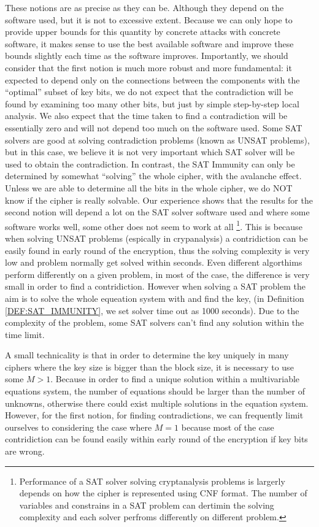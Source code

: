 These notions are as precise as they can be. Although they depend on the software used, but it is not to excessive extent. Because we can only hope to provide upper bounds for this quantity by concrete attacks with concrete software, it makes sense to use the best available software and improve these bounds slightly each time as the software improves.
Importantly, we should consider that the first notion is much more robust and more fundamental: it expected to depend only on the connections between the components with the ``optimal'' subset of key bits, we do not expect that the contradiction will be found by examining too many other bits, but just by simple step-by-step local analysis.
We also expect that the time taken to find a contradiction will be essentially zero and will not depend too much on the software used. Some SAT solvers are good at solving contradiction problems (known as UNSAT problems), but in this case, we believe it is not very important which SAT solver will be used to obtain the contradiction.
In contrast, the SAT Immunity can only be determined by somewhat ``solving'' the whole cipher,
with the avalanche effect.
Unless we are able to determine all the bits in the whole cipher,
we do NOT know if the cipher is really solvable.
Our experience shows that the results for the second notion will depend
a lot on the SAT solver software used and where some software works well,
some other does not seem to work at all \footnote{Performance of a SAT solver solving cryptanalysis problems is largerly depends on how the cipher is represented using CNF format. The number of variables and constrains in a SAT problem can dertimin the solving complexity and each solver perfroms differently on different problem.}. This is because when solving UNSAT problems (espically in crypanalysis) a contridiction can be easily found in early round of the encryption, thus the solving complexity is very low and problem normally get solved within seconds. Even different algorthims perform differently on a given problem, in most of the case, the difference is very small in order to find a contridiction. However when solving a SAT problem the aim is to solve the whole equeation system with and find the key, (in Definition \ref{DEF:SAT_IMMUNITY}, we set solver time out as 1000 seconds). Due to the complexity of the problem, some SAT solvers can't find any solution within the time limit.

A small technicality is that in order to determine the key uniquely
in many ciphers where the key size is bigger than the block size,
it is necessary to use some $M>1$. Because in order to find a unique solution within a multivariable equations system, the number of equations should be larger than the number of unknowns, otherwise there could exist multiple solutions in the equation system. However, for the first notion, for finding contradictions,
we can frequently limit ourselves to considering the case where $M=1$ because most of the case contridiction can be found easily within early round of the encryption if key bits are wrong.


